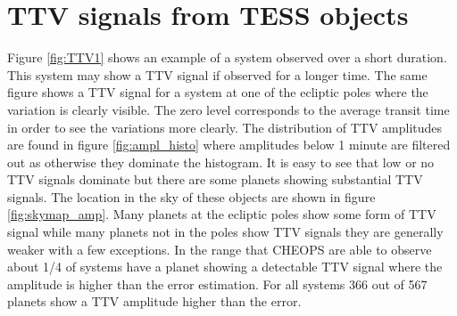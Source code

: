 \documentclass[12pt]{report}
\begin{document}
\section{TTV signals from TESS objects}
	Figure \ref{fig:TTV1} shows an example of a system observed over a short duration. This system may show a TTV signal if observed for a longer time. The same figure shows a TTV signal for a system at one of the ecliptic poles where the variation is clearly visible. The zero level corresponds to the average transit time in order to see the variations more clearly. The distribution of TTV amplitudes are found in figure \ref{fig:ampl_histo} where amplitudes below 1 minute are filtered out as otherwise they dominate the histogram. It is easy to see that low or no TTV signals dominate but there are some planets showing substantial TTV signals. The location in the sky of these objects are shown in figure \ref{fig:skymap_amp}. Many planets at the ecliptic poles show some form of TTV signal while many planets not in the poles show TTV signals they are generally weaker with a few exceptions. In the range that CHEOPS are able to observe about 1/4 of systems have a planet showing a detectable TTV signal where the amplitude is higher than the error estimation. For all systems 366 out of 567 planets show a TTV amplitude higher than the error.
	
\end{document}
